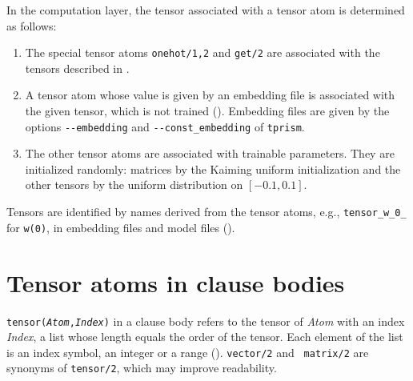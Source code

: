 \documentclass[a4paper]{report}
\begin{document}
In the computation layer, the tensor associated with a tensor atom is determined as follows:
\begin{enumerate}
	\item The special tensor atoms {\tt onehot/1,2} and {\tt get/2} are
	associated with the tensors described in .
	\item A tensor atom whose value is given by an embedding file is
	associated with the given tensor, which is not trained
	().  Embedding files are given by the
	options {\tt -{}-embedding} and {\tt -{}-const\_embedding} of {\tt tprism}.
	\item The other tensor atoms are associated with trainable parameters.
	They are initialized randomly: matrices by the Kaiming uniform
	initialization and the other tensors by the uniform distribution on
	$[-0.1,0.1]$.
\end{enumerate}
Tensors are identified by names derived from the tensor atoms, e.g.,
{\tt tensor\_w\_0\_} for {\tt w(0)}, in embedding files and model files
().

\section{Tensor atoms in clause bodies}
\label{sec:einsum}

{\tt tensor({\it Atom},{\it Index})} in a clause body refers to the tensor
of {\it Atom} with an index {\it Index}, a list whose length equals the
order of the tensor.  Each element of the list is an index symbol, an
integer or a range ().  {\tt vector/2} and {\tt
	matrix/2} are synonyms of {\tt tensor/2}, which may improve
readability.
\end{document}
